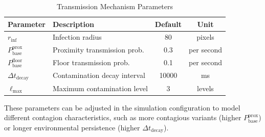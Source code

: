 \begin{table}[t]
\centering
\caption{Transmission Mechanism Parameters}
\label{tab:transmission-params}
\begin{tabular}{@{}llcc@{}}
\toprule
Parameter & Description & Default & Unit \\
\midrule
$r_{\text{inf}}$ & Infection radius & 80 & pixels \\
$P_{\text{base}}^{\text{prox}}$ & Proximity transmission prob. & 0.3 & per second \\
$P_{\text{base}}^{\text{floor}}$ & Floor transmission prob. & 0.1 & per second \\
$\Delta t_{\text{decay}}$ & Contamination decay interval & 10000 & ms \\
$\ell_{\max}$ & Maximum contamination level & 3 & levels \\
\bottomrule
\end{tabular}
\end{table}

These parameters can be adjusted in the simulation configuration to model different contagion characteristics, such as more contagious variants (higher $P_{\text{base}}^{\text{prox}}$) or longer environmental persistence (higher $\Delta t_{\text{decay}}$).
